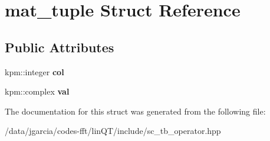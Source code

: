 \hypertarget{structmat__tuple}{}\section{mat\+\_\+tuple Struct Reference}
\label{structmat__tuple}
\subsection*{Public Attributes}
\begin{DoxyCompactItemize}
\item 
kpm\+::integer {\bfseries col}\hypertarget{structmat__tuple_abc600ba5b0981f3c9847aed404967998}{}\label{structmat__tuple_abc600ba5b0981f3c9847aed404967998}

\item 
kpm\+::complex {\bfseries val}\hypertarget{structmat__tuple_abd5586c075ab8d44b9081026742379da}{}\label{structmat__tuple_abd5586c075ab8d44b9081026742379da}

\end{DoxyCompactItemize}


The documentation for this struct was generated from the following file\+:\begin{DoxyCompactItemize}
\item 
/data/jgarcia/codes-\/fft/lin\+Q\+T/include/sc\+\_\+tb\+\_\+operator.\+hpp\end{DoxyCompactItemize}

